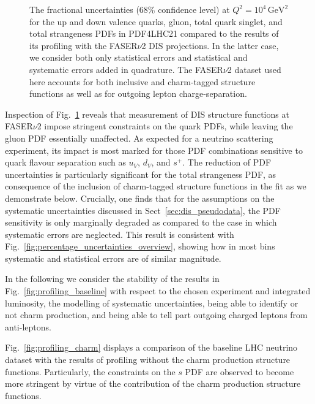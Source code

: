 \begin{figure}[t]
\caption{
The fractional uncertainties   (68\% confidence level) at $Q^2 = 10^4 \, \textrm{GeV}^2$ 
for the up and down valence quarks, gluon, total quark singlet, and total strangeness PDFs
in PDF4LHC21 compared to the results of its profiling with the FASER$\nu$2
DIS projections.
%
In the latter case, we consider both only statistical errors and statistical and systematic
errors added in quadrature.
%
The FASER$\nu$2 dataset used here accounts for both  inclusive and charm-tagged structure functions
as well as for outgoing lepton charge-separation.
%
}
\label{fig:profiling_syst}
\end{figure}

Inspection of Fig.~\ref{fig:profiling_syst} reveals that measurement of DIS structure
functions at FASER$\nu$2 impose stringent constraints on the quark PDFs, while leaving
the gluon PDF essentially unaffected.
%
As expected for a neutrino scattering experiment, its impact is most marked for
those PDF combinations sensitive to quark flavour separation such as $u_V$, $d_V$, and
$s^+$.
%
The reduction of PDF uncertainties is particularly significant for the total strangeness PDF,
as  consequence of the inclusion of charm-tagged structure functions in the fit as we demonstrate below.
%
Crucially, one finds that for the assumptions on the systematic uncertainties
discussed in Sect~\ref{sec:dis_pseudodata}, the PDF sensitivity is only marginally degraded
as compared to the case in which systematic errors are neglected.
%
This result is consistent with Fig.~\ref{fig:percentage_uncertainties_overview}, showing
how in most bins systematic and statistical errors are of similar magnitude.

In the following we consider the stability of the results in Fig.~\ref{fig:profiling_baseline}
with respect to the chosen experiment and integrated luminosity, the modelling of systematic
uncertainties, being able to identify or not charm production, and being able to tell part outgoing
charged leptons from anti-leptons.


%
Fig.~\ref{fig:profiling_charm} displays a comparison of the baseline LHC neutrino dataset with the results
of profiling without the charm production structure functions. 
Particularly, the constraints on the $s$ PDF are observed to become more stringent 
by virtue of the contribution of the charm production structure functions.

